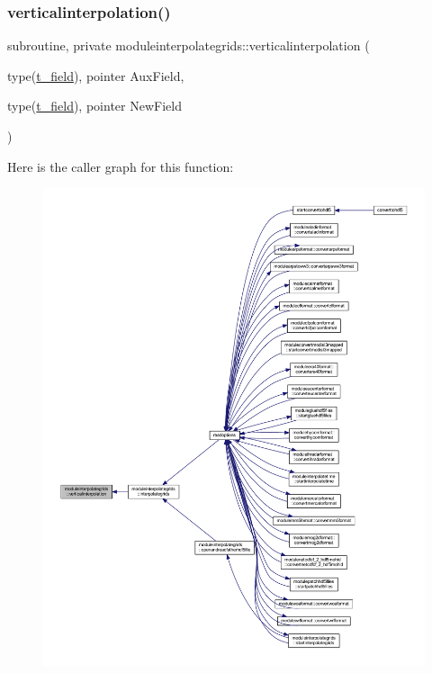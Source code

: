 \subsubsection{\texorpdfstring{verticalinterpolation()}{verticalinterpolation()}}
{\footnotesize\ttfamily subroutine, private moduleinterpolategrids\+::verticalinterpolation (\begin{DoxyParamCaption}\item[{type(\mbox{\hyperlink{structmoduleinterpolategrids_1_1t__field}{t\+\_\+field}}), pointer}]{Aux\+Field,  }\item[{type(\mbox{\hyperlink{structmoduleinterpolategrids_1_1t__field}{t\+\_\+field}}), pointer}]{New\+Field }\end{DoxyParamCaption})\hspace{0.3cm}{\ttfamily [private]}}

Here is the caller graph for this function\+:\nopagebreak
\begin{figure}[H]
\begin{center}
\leavevmode
\includegraphics[width=350pt]{namespacemoduleinterpolategrids_ad4787724d5952f571795f2c775d76d32_icgraph}
\end{center}
\end{figure}


